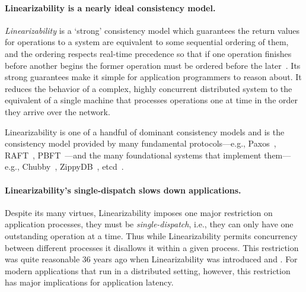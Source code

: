 \paragraph{Linearizability is a nearly ideal consistency model.}
\textit{Linearizability} is a `strong' consistency model which guarantees the return values for operations to a system are equivalent to some sequential ordering of them, and the ordering respects real-time precedence so that if one operation finishes before another begins the former operation must be ordered before the later~\cite{herlihy1987linearizability, herlihy1990linearizability}.
Its strong guarantees make it simple for application programmers to reason about. It reduces the behavior of a complex, highly concurrent distributed system to the equivalent of a single machine that processes operations one at time in the order they arrive over the network. 

Linearizability is one of a handful of dominant consistency models and is the consistency model provided by many fundamental protocols---e.g., Paxos~\cite{lamport1998paxos}, RAFT~\cite{ongaro2014raft}, PBFT~\cite{castro1999pbft}---and the many foundational systems that implement them---e.g., Chubby~\cite{chubby}, ZippyDB~\cite{zippydb}, etcd~\cite{etcd}.

\paragraph{Linearizability's single-dispatch slows down applications.}
Despite its many virtues, Linearizability imposes one major restriction on application processes, they must be \textit{single-dispatch}, i.e., they can only have one outstanding operation at a time. Thus while Linearizability permits concurrency between different processes it disallows it within a given process. This restriction was quite reasonable 36 years ago when Linearizability was introduced and . For modern applications that run in a distributed setting, however, this restriction has major implications for application latency.


